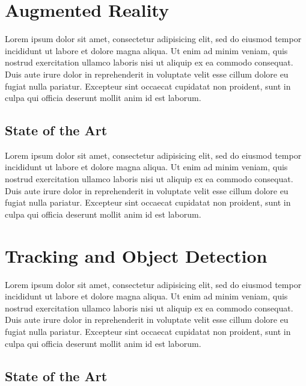 \section{Augmented Reality} %
\label{sec:basic_concepts:augmented_reality}

Lorem ipsum dolor sit amet, consectetur adipisicing elit, sed do eiusmod
tempor incididunt ut labore et dolore magna aliqua. Ut enim ad minim veniam,
quis nostrud exercitation ullamco laboris nisi ut aliquip ex ea commodo
consequat. Duis aute irure dolor in reprehenderit in voluptate velit esse
cillum dolore eu fugiat nulla pariatur. Excepteur sint occaecat cupidatat non
proident, sunt in culpa qui officia deserunt mollit anim id est laborum.

\subsection{State of the Art} %
\label{sub:basic_concepts:augmented_reality:state_of_the_art}

Lorem ipsum dolor sit amet, consectetur adipisicing elit, sed do eiusmod
tempor incididunt ut labore et dolore magna aliqua. Ut enim ad minim veniam,
quis nostrud exercitation ullamco laboris nisi ut aliquip ex ea commodo
consequat. Duis aute irure dolor in reprehenderit in voluptate velit esse
cillum dolore eu fugiat nulla pariatur. Excepteur sint occaecat cupidatat non
proident, sunt in culpa qui officia deserunt mollit anim id est laborum.



\section{Tracking and Object Detection} %
\label{sec:basic_concepts:tracking}

Lorem ipsum dolor sit amet, consectetur adipisicing elit, sed do eiusmod
tempor incididunt ut labore et dolore magna aliqua. Ut enim ad minim veniam,
quis nostrud exercitation ullamco laboris nisi ut aliquip ex ea commodo
consequat. Duis aute irure dolor in reprehenderit in voluptate velit esse
cillum dolore eu fugiat nulla pariatur. Excepteur sint occaecat cupidatat non
proident, sunt in culpa qui officia deserunt mollit anim id est laborum.

\subsection{State of the Art} %
\label{sub:basic_concepts:tracking:state_of_the_art}



